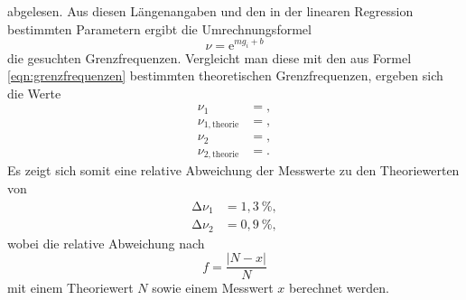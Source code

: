 abgelesen.
Aus diesen Längenangaben und den in der linearen Regression bestimmten Parametern ergibt die Umrechnungsformel
\begin{equation}
  \nu = \mathrm{e}^{m g_i + b}
\end{equation}
die gesuchten Grenzfrequenzen.
Vergleicht man diese mit den aus Formel \eqref{eqn:grenzfrequenzen} bestimmten theoretischen Grenzfrequenzen, ergeben sich die Werte
\begin{align*}
  \nu_{1} &= , \\
  \nu_{1, \text{theorie}} &= , \\
  \nu_{2} &= , \\
  \nu_{2, \text{theorie}} &= .
\end{align*}
Es zeigt sich somit eine relative Abweichung der Messwerte zu den Theoriewerten von
\begin{align*}
  \increment\nu_{1} &= 1,3\:\%, \\
  \increment\nu_{2} &= 0,9\:\%,
\end{align*}
wobei die relative Abweichung nach
\begin{equation}
f = \frac{\lvert N - x \rvert }{N}
\label{eqn:rel_err}
\end{equation}
mit einem Theoriewert $N$ sowie einem Messwert $x$ berechnet werden.\\


